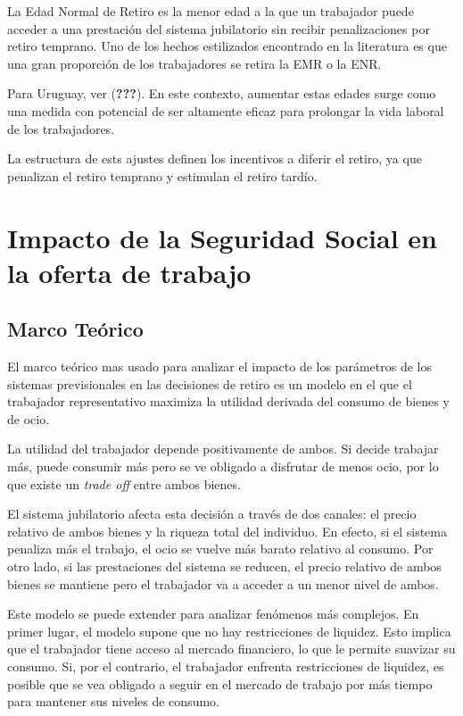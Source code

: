 \documentclass[]{article}
\begin{document}
La Edad Normal de Retiro es la menor edad a la que un trabajador puede
acceder a una prestación del sistema jubilatorio sin recibir
penalizaciones por retiro temprano. Uno de los hechos estilizados
encontrado en la literatura es que una gran proporción de los
trabajadores se retira la EMR o la ENR.

Para Uruguay, ver ({\textbf{???}}). En este contexto, aumentar estas
edades surge como una medida con potencial de ser altamente eficaz para
prolongar la vida laboral de los trabajadores.

La estructura de ests ajustes definen los incentivos a diferir el
retiro, ya que penalizan el retiro temprano y estimulan el retiro
tardío.

\section{Impacto de la Seguridad Social en la oferta de
trabajo}\label{impacto-de-la-seguridad-social-en-la-oferta-de-trabajo}

\subsection{Marco Teórico}\label{marco-teorico}

El marco teórico mas usado para analizar el impacto de los parámetros de
los sistemas previsionales en las decisiones de retiro es un modelo en
el que el trabajador representativo maximiza la utilidad derivada del
consumo de bienes y de ocio.

La utilidad del trabajador depende positivamente de ambos. Si decide
trabajar más, puede consumir más pero se ve obligado a disfrutar de
menos ocio, por lo que existe un \emph{trade off} entre ambos bienes.

El sistema jubilatorio afecta esta decisión a través de dos canales: el
precio relativo de ambos bienes y la riqueza total del individuo. En
efecto, si el sistema penaliza más el trabajo, el ocio se vuelve más
barato relativo al consumo. Por otro lado, si las prestaciones del
sistema se reducen, el precio relativo de ambos bienes se mantiene pero
el trabajador va a acceder a un menor nivel de ambos.

Este modelo se puede extender para analizar fenómenos más complejos. En
primer lugar, el modelo supone que no hay restricciones de liquidez.
Esto implica que el trabajador tiene acceso al mercado financiero, lo
que le permite suavizar su consumo. Si, por el contrario, el trabajador
enfrenta restricciones de liquidez, es posible que se vea obligado a
seguir en el mercado de trabajo por más tiempo para mantener sus niveles
de consumo.
\end{document}
